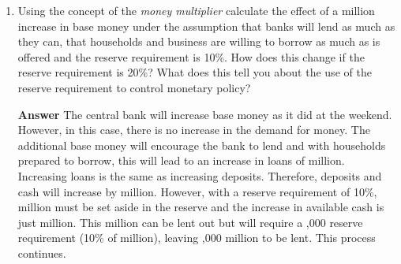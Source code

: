 \documentclass[14pt]{article}
\begin{document}
\begin{enumerate}

\item Using the concept of the \emph{money multiplier} calculate the effect of a  million increase in base money under the assumption that banks will lend as much as they can, that households and business are willing to borrow as much as is offered and the reserve requirement is 10\%.  How does this change if the reserve requirement is 20\%?  What does this tell you about the use of the reserve requirement to control monetary policy? 

\textbf{Answer}
The central bank will increase base money as it did at the weekend. However, in this case, there is no increase in the demand for money.  The additional base money will encourage the bank to lend and with households prepared to borrow, this will lead to an increase in loans of 
 million.  Increasing loans is the same as increasing deposits.  Therefore, deposits and cash will increase by  million.  However, with a reserve requirement of 10\%,  million must be set aside in the reserve and the increase in available cash is just  million.  This  million can be lent out but will require a ,000 reserve requirement (10\% of  million), leaving ,000 million to be lent.  This process continues. 




\end{enumerate}
\end{document}
